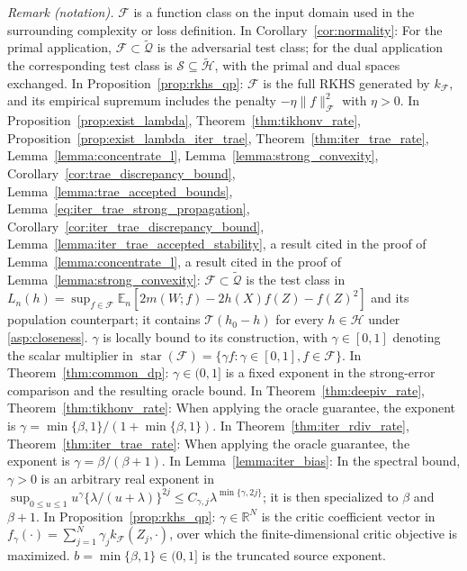 \documentclass[12pt]{article}
\theoremstyle{plain}
\theoremstyle{definition}
\theoremstyle{remark}
\begin{document}
\noindent\textit{Remark (notation).} $\mathcal F$ is a function class on the input domain used in the surrounding complexity or loss definition. In Corollary~\ref{cor:normality}: For the primal application, $\mathcal F\subset\tilde{\mathcal Q}$ is the adversarial test class; for the dual application the corresponding test class is $\mathcal S\subseteq\tilde{\mathcal H}$, with the primal and dual spaces exchanged. In Proposition~\ref{prop:rkhs_qp}: $\mathcal F$ is the full RKHS generated by $k_{\mathcal F}$, and its empirical supremum includes the penalty $-\eta\|f\|_{\mathcal F}^2$ with $\eta>0$. In Proposition~\ref{prop:exist_lambda}, Theorem~\ref{thm:tikhonv_rate}, Proposition~\ref{prop:exist_lambda_iter_trae}, Theorem~\ref{thm:iter_trae_rate}, Lemma~\ref{lemma:concentrate_l}, Lemma~\ref{lemma:strong_convexity}, Corollary~\ref{cor:trae_discrepancy_bound}, Lemma~\ref{lemma:trae_accepted_bounds}, Lemma~\ref{eq:iter_trae_strong_propagation}, Corollary~\ref{cor:iter_trae_discrepancy_bound}, Lemma~\ref{lemma:iter_trae_accepted_stability}, a result cited in the proof of Lemma~\ref{lemma:concentrate_l}, a result cited in the proof of Lemma~\ref{lemma:strong_convexity}: $\mathcal F\subset\tilde{\mathcal Q}$ is the test class in $L_n(h)=\sup_{f\in\mathcal F}\mathbb E_n[2m(W;f)-2h(X)f(Z)-f(Z)^2]$ and its population counterpart; it contains $\mathcal T(h_0-h)$ for every $h\in\mathcal H$ under \cref{asp:closeness}. $\gamma$ is locally bound to its construction, with $\gamma\in[0,1]$ denoting the scalar multiplier in $\operatorname{star}(\mathcal F)=\{\gamma f:\gamma\in[0,1],f\in\mathcal F\}$. In Theorem~\ref{thm:common_dp}: $\gamma\in(0,1]$ is a fixed exponent in the strong-error comparison and the resulting oracle bound. In Theorem~\ref{thm:deepiv_rate}, Theorem~\ref{thm:tikhonv_rate}: When applying the oracle guarantee, the exponent is $\gamma=\min\{\beta,1\}/(1+\min\{\beta,1\})$. In Theorem~\ref{thm:iter_rdiv_rate}, Theorem~\ref{thm:iter_trae_rate}: When applying the oracle guarantee, the exponent is $\gamma=\beta/(\beta+1)$. In Lemma~\ref{lemma:iter_bias}: In the spectral bound, $\gamma>0$ is an arbitrary real exponent in $\sup_{0\leqslant u\leqslant1}u^\gamma\{\lambda/(u+\lambda)\}^{2j}\leqslant C_{\gamma,j}\lambda^{\min\{\gamma,2j\}}$; it is then specialized to $\beta$ and $\beta+1$. In Proposition~\ref{prop:rkhs_qp}: $\gamma\in\mathbb R^N$ is the critic coefficient vector in $f_\gamma(\cdot)=\sum_{j=1}^N\gamma_j k_{\mathcal F}(Z_j,\cdot)$, over which the finite-dimensional critic objective is maximized. $b=\min\{\beta,1\}\in(0,1]$ is the truncated source exponent.
\end{document}
